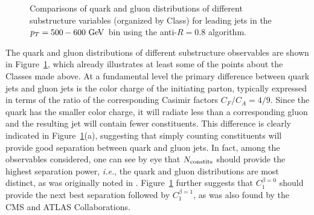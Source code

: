 \begin{figure}
\caption{Comparisons of quark and gluon distributions of different substructure variables (organized by Class) for leading jets in the 
$\pt=500-600 \GeV$ bin using the anti-\kT $R=0.8$ algorithm. }
\label{fig:qg_pt500_subst_AKt_R08}
\end{figure}

The quark and gluon distributions of different substructure observables
are shown in Figure~\ref{fig:qg_pt500_subst_AKt_R08}, which already illustrates at least some of the points about the Classes made above. 
At a fundamental level the primary difference between quark jets and gluon jets is the color charge of the initiating parton, typically expressed in terms of the
ratio of the corresponding Casimir factors $C_F/C_A = 4/9$.  Since the quark has the smaller color charge, it will radiate less than a corresponding
gluon and the resulting jet will contain fewer constituents. This difference is clearly indicated in Figure~\ref{fig:qg_pt500_subst_AKt_R08}(a), 
suggesting that simply counting constituents will provide good separation between quark and gluon jets.  In fact, among the observables
considered, one can see by eye that $N_{\rm constits}$ should provide the highest separation
power, \textit{i.e.}, the quark and gluon distributions are most distinct, as was originally noted in \cite{Gallicchio:2011xq,Gallicchio:2012ez}. 
Figure~\ref{fig:qg_pt500_subst_AKt_R08} further suggests
that $C_1^{\beta=0}$ should provide the next best separation followed by $C_1^{\beta=1}$, as was also
found by the CMS and ATLAS Collaborations\cite{CMS:2013kfa,Aad:2014gea}.   

